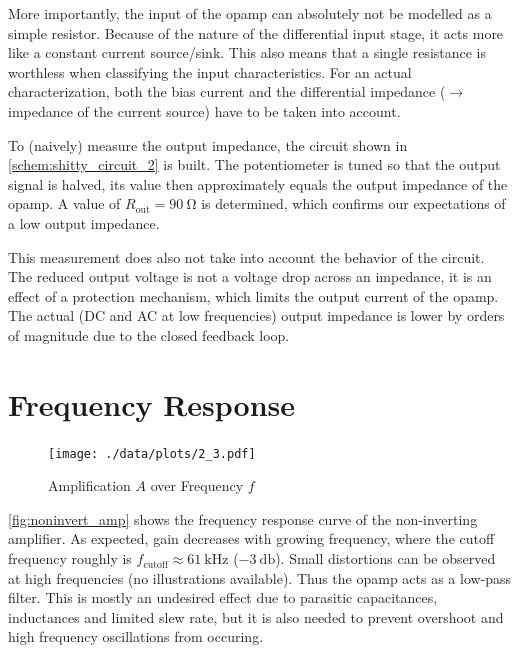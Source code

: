 More importantly, the input of the opamp can absolutely not be modelled as a simple resistor.
Because of the nature of the differential input stage, it acts more like a constant current source/sink.
This also means that a single resistance is worthless when classifying the input characteristics.	%
For an actual characterization, both the bias current and the differential impedance ($\rightarrow$ impedance of the current source) have to be taken into account.

To (naively) measure the output impedance, the circuit shown in \autoref{schem:shitty_circuit_2} is built.
The potentiometer is tuned so that the output signal is halved, its value then approximately equals the output impedance of the opamp.
A value of $R_\text{out}=\SI{90}{\ohm}$ is determined, which confirms our expectations of a low output impedance.

This measurement does also not take into account the behavior of the circuit.
The reduced output voltage is not a voltage drop across an impedance, it is an effect of a protection mechanism, which limits the output current of the opamp.
The actual (DC and AC at low frequencies) output impedance is lower by orders of magnitude due to the closed feedback loop.

\section{Frequency Response}
\begin{figure}[tbp]
	\centering
	\texttt{[image: ./data/plots/2\_3.pdf]}
	\caption{Amplification $A$ over Frequency $f$}
	\label{fig:noninvert_amp}
\end{figure}

\autoref{fig:noninvert_amp} shows the frequency response curve of the non-inverting amplifier.
As expected, gain decreases with growing frequency, where the cutoff frequency roughly is $f_\text{cutoff}\approx\SI{61}{\kilo\hertz}$ ($\SI{-3}{\decibel}$).
Small distortions can be observed at high frequencies (no illustrations available).
Thus the opamp acts as a low-pass filter.
This is mostly an undesired effect due to parasitic capacitances, inductances and limited slew rate, but it is also needed to prevent overshoot and high frequency oscillations from occuring.
